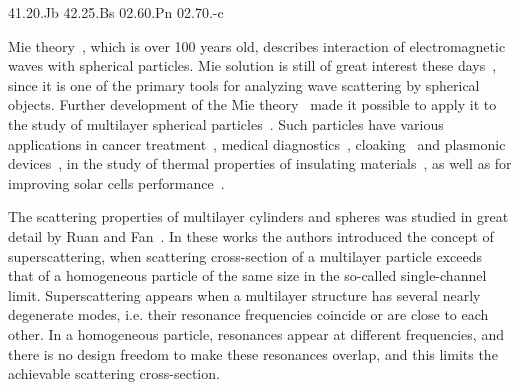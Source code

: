 \documentclass[aps,prl,twocolumn,showpacs,superscriptaddress,groupedaddress]{revtex4-1}
\begin{document}
\pacs%
{41.20.Jb 42.25.Bs 02.60.Pn 02.70.-c}

\maketitle %

Mie theory~\cite{Mie-1908}, which is over 100 years old, describes
interaction of electromagnetic waves with spherical particles. Mie
solution is still of great interest these
days~\cite{Suzuki-2008,MacKowski-2012,Lerme-2000,Xu-2005,Li-2006,Gogoi-2010,Santiago-2011},
since it is one of the primary tools for analyzing wave scattering by
spherical objects. Further development of the Mie
theory~\cite{Yang-2003, Pena-scattnlay-2009} made it possible to apply
it to the study of multilayer spherical
particles~\cite{Sheehan-2013,Selmke-2012}.  Such particles have
various applications in cancer treatment~\cite{Zhang-2010,
  Hirsch-2003}, medical diagnostics~\cite{Allain-2002},
cloaking~\cite{Qui-2009, Semouchkina-2013, Ladutenko-2014} and
plasmonic devices~\cite{Martin-2013, Alu-2005}, in the study of
thermal properties of insulating materials~\cite{Xie-2013}, as well as
for improving solar cells performance~\cite{Kameya-2011,Mann-2011}.

The scattering properties of multilayer cylinders and spheres was
studied in great detail by Ruan and Fan~\cite{Fan-2010,Fan-2011}.  In
these works the authors introduced the concept of superscattering,
when scattering cross-section of a multilayer particle exceeds that of
a homogeneous particle of the same size in the so-called
single-channel limit. Superscattering appears when a multilayer
structure has several nearly degenerate modes, i.e. their resonance
frequencies coincide or are close to each other. In a homogeneous
particle, resonances appear at different frequencies, and there is no
design freedom to make these resonances overlap, and this limits the
achievable scattering cross-section.
\end{document}
